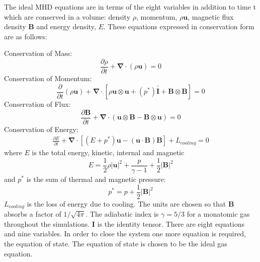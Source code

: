 The ideal MHD equations are in terms of the eight variables in addition to time t which are conserved in a volume: 
density $\rho$, momentum, $\rho \mathbf u$, magnetic flux density $\mathbf B$ and energy density, $E$.
These equations expressed in conservation form are as follows:

\noindent
Conservation of Mass:
\begin{equation}
\frac{\partial \rho}{\partial t}+\boldsymbol{\nabla}\cdot(\rho \mathbf u)=0
\end{equation}
Conservation of Momentum:
\begin{equation}
\frac{\partial}{\partial t}\left(
\rho \mathbf u
\right)
+\boldsymbol{\nabla}
\cdot
\left[
\rho \mathbf u \otimes \mathbf u
+\left(
p^*
\right)
\mathbf{{\overline {\overline I}}}
+\mathbf{B} \otimes \mathbf{B}
\right]
=0
\end{equation}
Conservation of Flux:
\begin{equation}
\frac{\partial \mathbf{B} }{\partial t}+
\boldsymbol{\nabla}
\cdot
(
\mathbf{u} \otimes \mathbf{B}-
\mathbf{B} \otimes \mathbf{u})
= 0
\end{equation}
Conservation of Energy:
\begin{eqnarray}
\frac{\partial E}{\partial t}
+\boldsymbol{\nabla}
\cdot
\left[
\left( E + p^*\right) \mathbf{u}
- (\mathbf{u}\cdot\mathbf{B})\mathbf{B}
\right] + L_{cooling} = 0
\end{eqnarray}
where $E$ is the total energy, kinetic, internal and magnetic 
\begin{equation}
E =
\frac{1}{2}\rho |\mathbf{u}|^2 + 
\frac{p}{\gamma-1}+
\frac{1}{2} |\mathbf{B}|^2
\end{equation}
and $p^*$ is the sum of thermal and magnetic pressure:
\begin{equation}
p^* = p + \frac{1}{2}|\mathbf{B}|^2
\end{equation}
$L_{cooling}$ is the loss of energy due to cooling.
The units are chosen so that $\mathbf B$ absorbs a factor of $1/\sqrt {4 \pi}$.
The adiabatic index is $\gamma = 5/3$ for a monatomic gas throughout the simulations.
$\mathbf{I}$ is the identity tensor.
There are eight equations and nine variables. In order to close the system one more equation is required, the equation of state.
The equation of state is chosen to be the ideal gas equation.





